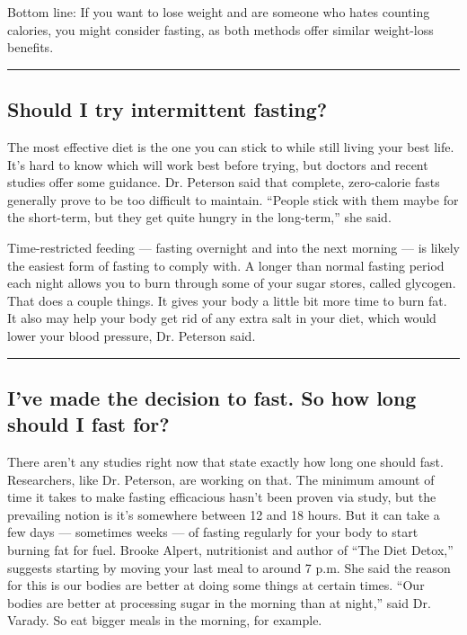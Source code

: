 Bottom line: If you want to lose weight and are someone who hates
counting calories, you might consider fasting, as both methods offer
similar weight-loss benefits.

\begin{center}\rule{0.5\linewidth}{\linethickness}\end{center}

\hypertarget{should-i-try-intermittent-fasting}{%
\subsection{Should I try intermittent
fasting?}\label{should-i-try-intermittent-fasting}}

The most effective diet is the one you can stick to while still living
your best life. It's hard to know which will work best before trying,
but doctors and recent studies offer some guidance. Dr. Peterson said
that complete, zero-calorie fasts generally prove to be too difficult to
maintain. ``People stick with them maybe for the short-term, but they
get quite hungry in the long-term,'' she said.

Time-restricted feeding --- fasting overnight and into the next morning
--- is likely the easiest form of fasting to comply with. A longer than
normal fasting period each night allows you to burn through some of your
sugar stores, called glycogen. That does a couple things. It gives your
body a little bit more time to burn fat. It also may help your body get
rid of any extra salt in your diet, which would lower your blood
pressure, Dr. Peterson said.

\begin{center}\rule{0.5\linewidth}{\linethickness}\end{center}

\hypertarget{ive-made-the-decision-to-fast-so-how-long-should-i-fast-for}{%
\subsection{I've made the decision to fast. So how long should I fast
for?}\label{ive-made-the-decision-to-fast-so-how-long-should-i-fast-for}}

There aren't any studies right now that state exactly how long one
should fast. Researchers, like Dr. Peterson, are working on that. The
minimum amount of time it takes to make fasting efficacious hasn't been
proven via study, but the prevailing notion is it's somewhere between 12
and 18 hours. But it can take a few days --- sometimes weeks --- of
fasting regularly for your body to start burning fat for fuel. Brooke
Alpert, nutritionist and author of ``The Diet Detox,'' suggests starting
by moving your last meal to around 7 p.m. She said the reason for this
is our bodies are better at doing some things at certain times. ``Our
bodies are better at processing sugar in the morning than at night,''
said Dr. Varady. So eat bigger meals in the morning, for example.

